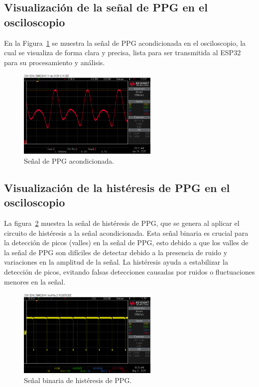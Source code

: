     \subsection{Visualización de la señal de PPG en el osciloscopio}
    En la Figura~\ref{fig:PPG_Osciloscopio} se muestra la señal de PPG acondicionada en el osciloscopio, la cual se visualiza de forma clara y precisa, lista para ser transmitida al ESP32 para su procesamiento y análisis.

    \begin{figure}[H]
        \centering
        \includegraphics[width=0.6\textwidth]{img/Desarrollo/ppg_osciloscopio.png}
        \caption[Señal de PPG acondicionada.]{Señal de PPG acondicionada.\footnotemark}
        \label{fig:PPG_Osciloscopio}
    \end{figure}

    \subsection{Visualización de la histéresis de PPG en el osciloscopio}

    La figura~\ref{fig:PPG_Osciloscopio_Histeresis} muestra la señal de histéresis de PPG, que se genera al aplicar el circuito de histéresis a la señal acondicionada. Esta señal binaria es crucial para la detección de picos (valles) en la señal de PPG, esto debido a que los valles de la señal de PPG son difíciles de detectar debido a la presencia de ruido y variaciones en la amplitud de la señal. La histéresis ayuda a estabilizar la detección de picos, evitando falsas detecciones causadas por ruidos o fluctuaciones menores en la señal.

    \begin{figure}[H]
        \centering
        \includegraphics[width=0.6\textwidth]{img/Desarrollo/ppg_histeresis.png}
        \caption[Señal de histéresis de PPG.]{Señal binaria de histéresis de PPG.\footnotemark}
        \label{fig:PPG_Osciloscopio_Histeresis}
    \end{figure}

